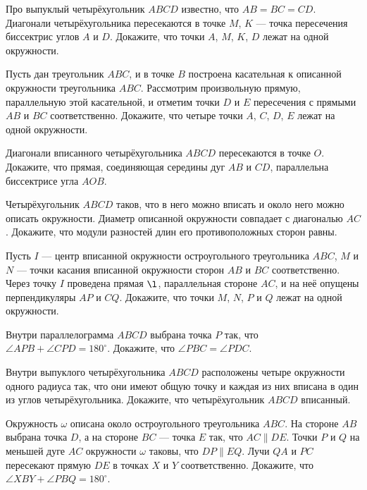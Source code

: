 \documentclass{article}
\begin{document}
\begin{enumerate_boxed}
        \item Про выпуклый четырёхугольник $ABCD$ известно, что $AB=BC=CD$.
        Диагонали четырёхугольника пересекаются в точке $M$, $K$ — точка пересечения биссектрис углов $A$ и $D$.
        Докажите, что точки $A$, $M$, $K$, $D$ лежат на одной окружности.

        \item Пусть дан треугольник $ABC$, и в точке $B$ построена касательная к описанной окружности треугольника $ABC$.
        Рассмотрим произвольную прямую, параллельную этой касательной, и отметим точки $D$ и $E$ пересечения с прямыми $AB$ и $BC$ соответственно.
        Докажите, что четыре точки $A$, $C$, $D$, $E$ лежат на одной окружности.

        \item Диагонали вписанного четырёхугольника $ABCD$ пересекаются в точке $O$.
        Докажите, что прямая, соединяющая середины дуг $AB$ и $CD$, параллельна биссектрисе угла $AOB$.

        \item Четырёхугольник $ABCD$ таков, что в него можно вписать и около него можно описать окружности.
        Диаметр описанной окружности совпадает с диагональю $AC$.
        Докажите, что модули разностей длин его противоположных сторон равны.

        \item Пусть $I$ — центр вписанной окружности остроугольного треугольника $ABC$, $M$ и $N$ — точки касания вписанной окружности сторон $AB$ и $BC$ соответственно.
        Через точку $I$ проведена прямая $\l$, параллельная стороне $AC$, и на неё опущены перпендикуляры $AP$ и $CQ$.
        Докажите, что точки $M$, $N$, $P$ и $Q$ лежат
        на одной окружности.

        \item Внутри параллелограмма $ABCD$ выбрана точка $P$ так, что $\angle AP B+\angle CP D = 180^\circ$.
        Докажите, что $\angle PBC = \angle PDC$.

        \item Внутри выпуклого четырёхугольника $ABCD$ расположены четыре окружности одного радиуса так, что они имеют общую точку и каждая из них вписана в один из углов четырёхугольника.
        Докажите, что четырёхугольник $ABCD$ вписанный.

        \item Окружность $\omega$ описана около остроугольного треугольника $ABC$.
        На стороне $AB$ выбрана точка $D$, а на стороне $BC$ — точка $E$ так, что $AC \parallel DE$.
        Точки $P$ и $Q$ на меньшей дуге $AC$ окружности $\omega$ таковы, что $DP \parallel EQ$.
        Лучи $QA$ и $PC$ пересекают прямую $DE$ в точках $X$ и $Y$ соответственно.
        Докажите, что $\angle XBY + \angle P BQ = 180^\circ$.


\end{enumerate_boxed}
\end{document}
